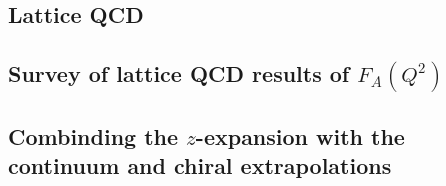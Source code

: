 \subsection{Lattice QCD\label{sec:lqcd_intro}}




\subsection{Survey of lattice QCD results of $F_A(Q^2)$\label{sec:lqcd_results}}



\subsection{Combinding the $z$-expansion with the continuum and chiral extrapolations\label{sec:z_continuum}}
